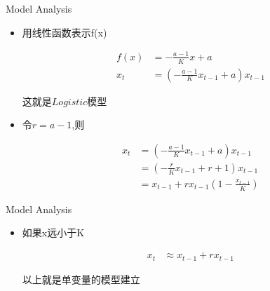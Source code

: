 \documentclass{beamer}
\begin{document}
\begin{frame}{Model Analysis \uppercase\expandafter{}}
 \begin{itemize}
     \item 用线性函数表示f(x)
      \begin{block}{}
		 \begin{equation*}
		  \begin{aligned}
			f(x)&=-\frac{a-1}{K}x+a \\
			x_t&=(-\frac{a-1}{K}x_{t-1}+a)x_{t-1} 
		  \end{aligned}
		 \end{equation*}
        \end{block}
        这就是$Logistic$模型
     \item 令$r=a-1$,则
      \begin{block}{}
		 \begin{equation*}
		  \begin{aligned}
			x_t&=(-\frac{a-1}{K}x_{t-1}+a)x_{t-1}\\ 
			&=(-\frac{r}{K}x_{t-1}+r+1)x_{t-1}\\
			&=x_{t-1}+rx_{t-1}(1-\frac{x_{t-1}}{K})
		  \end{aligned}
		 \end{equation*}
        \end{block}
 \end{itemize}
\end{frame}

\begin{frame}{Model Analysis \uppercase\expandafter{}}
 \begin{itemize}
     \item 如果x远小于K
      \begin{block}{}
		 \begin{equation*}
		  \begin{aligned}
			x_t&\approx x_{t-1}+rx_{t-1}
		  \end{aligned}
		 \end{equation*}
        \end{block}
        以上就是单变量的模型建立
 \end{itemize}
\end{frame}
\end{document}
